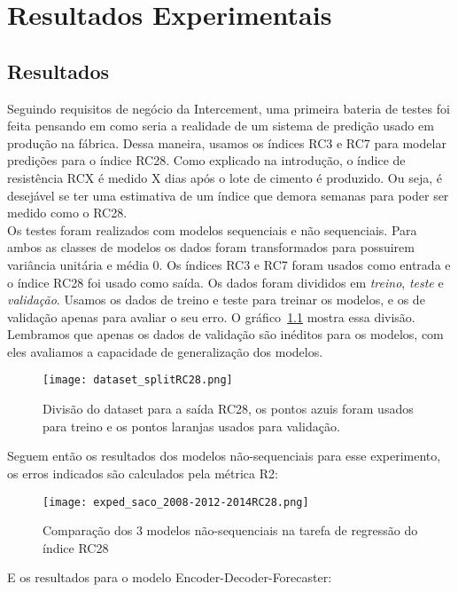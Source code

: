 
\chapter{Resultados Experimentais }
\label{cap:resultados}

\section{Resultados}





Seguindo requisitos de negócio da Intercement, uma primeira
bateria de testes foi feita pensando em como seria a realidade de um sistema de
predição usado em produção na fábrica. Dessa maneira, usamos os índices RC3 e
RC7 para modelar predições para o índice RC28. Como explicado na introdução, o
índice de resistência RCX é medido X dias após o lote de cimento é produzido. Ou
seja, é desejável se ter uma estimativa de um índice que demora semanas para
poder ser medido como o RC28. \\


Os testes foram realizados com modelos sequenciais e não sequenciais. Para ambos
as classes de modelos os dados foram transformados para possuirem variância
unitária e média 0. Os índices RC3 e RC7 foram usados como entrada e o índice
RC28 foi usado como saída. Os dados foram divididos em
\textit{treino}, \textit{teste} e \textit{validação}. Usamos os dados de treino
e teste para treinar os
modelos, e os de validação apenas para avaliar o seu erro. O
gráfico~\ref{fig:divrc28} mostra essa divisão. Lembramos que apenas os dados de
validação são inéditos para os modelos, com eles avaliamos a capacidade de
generalização dos modelos. 


\begin{figure}[H]
  \centering
\texttt{[image: dataset\_splitRC28.png]}
\caption{Divisão do dataset para a saída RC28, os pontos azuis foram usados para
treino e os pontos laranjas usados para validação.}
  \label{fig:divrc28}
\end{figure}





Seguem então os resultados dos modelos não-sequenciais para esse experimento, os
erros indicados são calculados pela métrica R2: \\



\begin{figure}[H]
\centering
\texttt{[image: exped\_saco\_2008-2012-2014RC28.png]}
\caption{Comparação dos 3 modelos não-sequenciais na tarefa de regressão do índice RC28}
\label{fig:3nseq}
\end{figure}



E os resultados para o modelo Encoder-Decoder-Forecaster: \\




